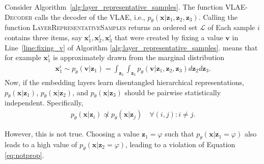 Consider Algorithm~\ref{alg:layer_representative_samples}.
The function \textsc{VLAE-Decoder} calls the decoder of the \ac{VLAE}, i.e., $p_\theta(\bm{x} | \bm{z}_1, \bm{z}_2, \bm{z}_3)$.
Calling the function \textsc{LayerRepresentativeSamples} returns an ordered set $\mathcal{L}$ of 
Each sample $i$ contains three items, say $\bm{x}_1^i, \bm{x}_2^i, \bm{x}_3^i$ that were created by fixing a value $\bm{v}$ in Line~\ref{line:fixing_v} of Algorithm \ref{alg:layer_representative_samples}.
 means that for example $\bm{x}_1^i$ is approximately drawn from the marginal distribution
\begin{align}
    \bm{x}_1^i \sim p_\theta(\bm{v} | \bm{z}_1) = \int_{\bm{z}_2} \int_{\bm{z}_3} p_\theta(\bm{v} | \bm{z}_1, \bm{z}_2, \bm{z}_3) d\bm{z}_2 d\bm{z}_3.
\end{align}
Now, if the embedding layers learn disentangled hierarchical representations, $p_\theta(\bm{x} | \bm{z}_1)$, $p_\theta(\bm{x} | \bm{z}_2)$, and $p_\theta(\bm{x} | \bm{z}_3)$ should be pairwise statistically independent.
Specifically,
\begin{align}
    p_\theta(\bm{x} | \bm{z}_i) \not \propto p_\theta(\bm{x} | \bm{z}_j) \quad \forall (i,j):i\neq j. \label{eq:notprop}
\end{align}

However, this is not true.
Choosing a value $\bm{z}_1 = \varphi$ such that $p_\theta(\bm{x} | \bm{z}_1 = \varphi)$ also leads to a high value of $p_\theta(\bm{x} | \bm{z}_2 = \varphi)$, leading to a violation of Equation \ref{eq:notprop}.

